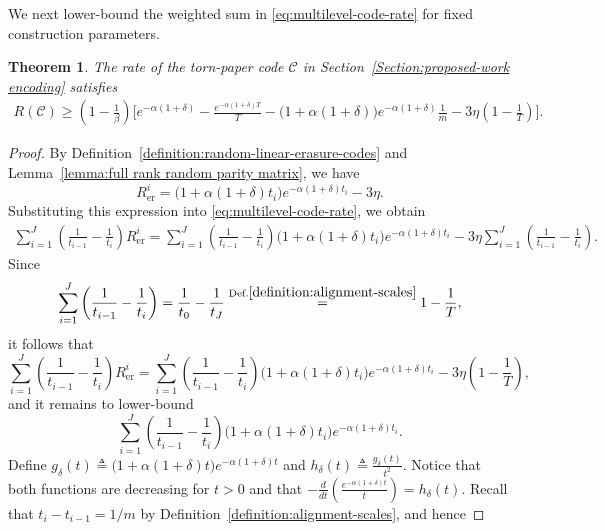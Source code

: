 \documentclass[journal,letterpaper,onecolumn,11pt]{IEEEtran}
\newcommand{\cC}{\mathcal{C}}
\newtheorem{theorem}{Theorem}
\begin{document}
We next lower-bound the weighted sum in
\eqref{eq:multilevel-code-rate} for fixed construction parameters.

\begin{theorem}
\label{theorem:finite-parameter-rate}
The rate of the torn-paper code $\cC$ in Section~\ref{Section:proposed-work encoding} satisfies
\begin{align*}
R(\cC)
\geq
\left(1-\frac{1}{\beta}\right)
\Bigg[
e^{-\alpha(1+\delta)}
-\frac{e^{-\alpha(1+\delta)T}}{T} -
\bigl(1+\alpha(1+\delta)\bigr)
e^{-\alpha(1+\delta)}
\frac{1}{m}
-3\eta\left(1-\frac{1}{T}\right)
\Bigg].
\label{eq:finite-parameter-rate}
\end{align*}

\end{theorem}

\begin{proof}
By Definition~\ref{definition:random-linear-erasure-codes} and
Lemma~\ref{lemma:full rank random parity matrix}, we have
\[
R_{\mathrm{er}}^i
=
\bigl(1+\alpha(1+\delta)t_i\bigr)
e^{-\alpha(1+\delta)t_i}
-3\eta.
\]
Substituting this expression into
\eqref{eq:multilevel-code-rate}, we obtain
\[
\begin{aligned}
\sum_{i=1}^{J}
\left(
\frac{1}{t_{i-1}}-\frac{1}{t_i}
\right)R_{\mathrm{er}}^i
=
\sum_{i=1}^{J}
\left(
\frac{1}{t_{i-1}}-\frac{1}{t_i}
\right)
\bigl(1+\alpha(1+\delta)t_i\bigr)
e^{-\alpha(1+\delta)t_i}
-3\eta
\sum_{i=1}^{J}
\left(
\frac{1}{t_{i-1}}-\frac{1}{t_i}
\right).
\end{aligned}
\]
Since
\[
\sum_{i=1}^{J}
\left(
\frac{1}{t_{i-1}}-\frac{1}{t_i}
\right)
=
\frac{1}{t_0}-\frac{1}{t_J}
\overset{\text{Def.}\ref{definition:alignment-scales}}{=}
1-\frac{1}{T},
\]
it follows that
\begin{equation}\label{equation:expression of rc}
\sum_{i=1}^{J}
\left(
\frac{1}{t_{i-1}}-\frac{1}{t_i}
\right)R_{\mathrm{er}}^i
=
\sum_{i=1}^{J}
\left(
\frac{1}{t_{i-1}}-\frac{1}{t_i}
\right)
\bigl(1+\alpha(1+\delta)t_i\bigr)
e^{-\alpha(1+\delta)t_i}
-3\eta\left(1-\frac{1}{T}\right),
\end{equation}
and it remains to lower-bound
\[
\sum_{i=1}^{J}
\left(
\frac{1}{t_{i-1}}-\frac{1}{t_i}
\right)
\bigl(1+\alpha(1+\delta)t_i\bigr)
e^{-\alpha(1+\delta)t_i}.
\]
Define
$
g_\delta(t)
\triangleq
\bigl(1+\alpha(1+\delta)t\bigr)
e^{-\alpha(1+\delta)t}
$
and
$
h_\delta(t)
\triangleq
\frac{g_\delta(t)}{t^2}.
$
Notice that both functions are decreasing for \(t>0\) and that
$
-\frac{d}{dt}
\left(
\frac{e^{-\alpha(1+\delta)t}}{t}
\right)
=
h_\delta(t)
$.
Recall that \(t_i-t_{i-1}=1/m\) by Definition~\ref{definition:alignment-scales}, and hence

\end{proof}
\end{document}
